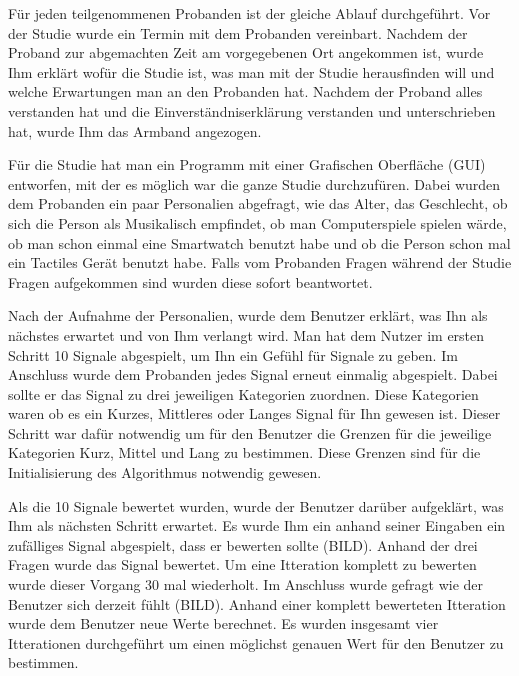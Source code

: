F{\"u}r jeden teilgenommenen Probanden ist der gleiche Ablauf durchgef{\"u}hrt. 
Vor der Studie wurde ein Termin mit dem Probanden vereinbart. Nachdem der Proband zur abgemachten Zeit am vorgegebenen Ort angekommen ist, wurde Ihm erkl{\"a}rt wof{\"u}r die Studie ist, was man mit der Studie herausfinden will und welche Erwartungen man an den Probanden hat. 
Nachdem der Proband alles verstanden hat und die Einverst{\"a}ndniserkl{\"a}rung verstanden und unterschrieben hat, wurde Ihm das Armband angezogen. 

F{\"u}r die Studie hat man ein Programm mit einer Grafischen Oberfl{\"a}che (GUI) entworfen, mit der es m{\"o}glich war die ganze Studie durchzuf{\"u}ren. 
Dabei wurden dem Probanden ein paar Personalien abgefragt, wie das Alter, das Geschlecht, ob sich die Person als Musikalisch empfindet, ob man Computerspiele spielen w{\"a}rde, ob man schon einmal eine Smartwatch benutzt habe und ob die Person schon mal ein Tactiles Ger{\"a}t benutzt habe. Falls vom Probanden Fragen w{\"a}hrend der Studie Fragen aufgekommen sind wurden diese sofort beantwortet. 

Nach der Aufnahme der Personalien, wurde dem Benutzer erkl{\"a}rt, was Ihn als n{\"a}chstes erwartet und von Ihm verlangt wird. 
Man hat dem Nutzer im ersten Schritt 10 Signale abgespielt, um Ihn ein Gef{\"u}hl f{\"u}r Signale zu geben. Im Anschluss wurde dem Probanden jedes Signal erneut einmalig abgespielt. Dabei sollte er das Signal zu drei jeweiligen Kategorien zuordnen. Diese Kategorien waren ob es ein Kurzes, Mittleres oder Langes Signal f{\"u}r Ihn gewesen ist. Dieser Schritt war daf{\"u}r notwendig um f{\"u}r den Benutzer die Grenzen f{\"u}r die jeweilige Kategorien Kurz, Mittel und Lang zu bestimmen. 
Diese Grenzen sind f{\"u}r die Initialisierung des Algorithmus notwendig gewesen. 

Als die 10 Signale bewertet wurden, wurde der Benutzer dar{\"u}ber aufgekl{\"a}rt, was Ihm als n{\"a}chsten Schritt erwartet. Es wurde Ihm ein anhand seiner Eingaben ein zuf{\"a}lliges Signal abgespielt, dass er bewerten sollte (BILD). Anhand der drei Fragen wurde das Signal bewertet. Um eine Itteration komplett zu bewerten wurde dieser Vorgang 30 mal wiederholt. Im Anschluss wurde gefragt wie der Benutzer sich derzeit f{\"u}hlt (BILD). Anhand einer komplett bewerteten Itteration wurde dem Benutzer neue Werte berechnet. Es wurden insgesamt vier Itterationen durchgef{\"u}hrt um einen m{\"o}glichst genauen Wert f{\"u}r den Benutzer zu bestimmen.

